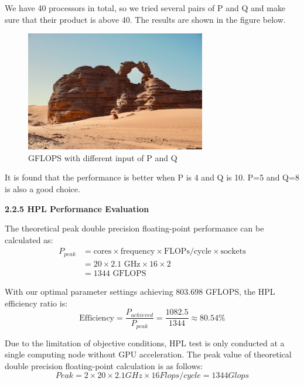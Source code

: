 \documentclass[a4paper,12pt]{article}
\begin{document}
We have 40 processors in total, so we tried several pairs of P and Q and make sure that their product is above 40. The results are shown in the figure below.

\begin{figure}[H]
    \centering
    \includegraphics[width=0.7\textwidth]{GFLOPS_PQ.png}
    \caption{GFLOPS with different input of P and Q}
    \label{fig:gflops_pq}
\end{figure}

It is found that the performance is better when P is 4 and Q is 10. P=5 and Q=8 is also a good choice.

\textbf{2.2.5 HPL Performance Evaluation}

The theoretical peak double precision floating-point performance can be calculated as:
\begin{equation}
    \begin{split}
        P_{peak} &= \text{cores} \times \text{frequency} \times \text{FLOPs/cycle} \times \text{sockets} \\
        &= 20 \times 2.1\text{ GHz} \times 16 \times 2 \\
        &= 1344 \text{ GFLOPS}
    \end{split}
\end{equation}

With our optimal parameter settings achieving 803.698 GFLOPS, the HPL efficiency ratio is:
\begin{equation}
    \text{Efficiency} = \frac{P_{achieved}}{P_{peak}} = \frac{1082.5}{1344} \approx 80.54\%
\end{equation}

Due to the limitation of objective conditions, HPL test is only conducted at a single computing node without GPU acceleration. The peak value of theoretical double precision floating-point calculation is as follows:
\begin{equation*}
Peak = 2 \times 20 \times 2.1GHz \times 16Flops/cycle = 1344Glops
\end{equation*}
\end{document}
